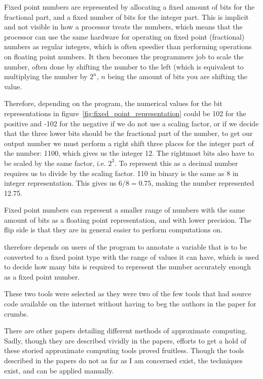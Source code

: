 Fixed point numbers are represented by allocating a fixed amount of bits for the fractional part, and a fixed number of bits for the integer part. This is implicit and not visible in how a processor treats the numbers, which means that the processor can use the same hardware for operating on fixed point (fractional) numbers as regular integers, which is often speedier than performing operations on floating point numbers. It then becomes the programmers job to scale the number, often done by shifting the number to the left (which is equivalent to multiplying the number by $2^n$, $n$ being the amount of bits you are shifting the value.

Therefore, depending on the program, the numerical values for the bit representations in figure~\ref{fig:fixed_point_representation} could be 102 for the positive and -102 for the negative if we do not use a scaling factor, or if we decide that the three lower bits should be the fractional part of the number, to get our output number we must perform a right shift three places for the integer part of the number: 1100, which gives us the integer 12. The rightmost bits also have to be scaled by the same factor, i.e. $2^3$. To represent this as a decimal number requires us to divide by the scaling factor. 110 in binary is the same as 8 in integer representation. This gives us $6/8 = 0.75$, making the number represented 12.75.

Fixed point numbers can represent a smaller range of numbers with the same amount of bits as a floating point representation, and with lower precision. The flip side is that they are in general easier to perform computations on. 

\taffo therefore depends on users of the program to annotate a variable that is to be converted to a fixed point type with the range of values it can have, which is used to decide how many bits is required to represent the number accurately enough as a fixed point number. 

These two tools were selected as they were two of the few tools that had source code available on the internet without having to beg the authors in the paper for crumbs. 

There are other papers detailing different methods of approximate computing. Sadly, though they are described vividly in the papers, efforts to get a hold of these storied approximate computing tools proved fruitless. Though the tools described in the papers do not as far as I am concerned exist, the techniques exist, and can be applied manually.

